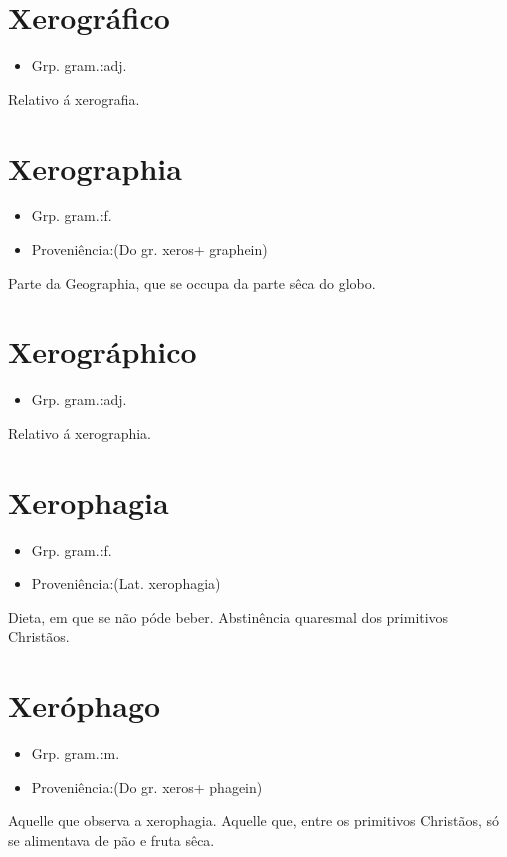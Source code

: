\section{Xerográfico}
\begin{itemize}
\item {Grp. gram.:adj.}
\end{itemize}
Relativo á xerografia.
\section{Xerographia}
\begin{itemize}
\item {Grp. gram.:f.}
\end{itemize}
\begin{itemize}
\item {Proveniência:(Do gr. \textunderscore xeros\textunderscore  + \textunderscore graphein\textunderscore )}
\end{itemize}
Parte da Geographia, que se occupa da parte sêca do globo.
\section{Xerográphico}
\begin{itemize}
\item {Grp. gram.:adj.}
\end{itemize}
Relativo á xerographia.
\section{Xerophagia}
\begin{itemize}
\item {Grp. gram.:f.}
\end{itemize}
\begin{itemize}
\item {Proveniência:(Lat. \textunderscore xerophagia\textunderscore )}
\end{itemize}
Dieta, em que se não póde beber.
Abstinência quaresmal dos primitivos Christãos.
\section{Xeróphago}
\begin{itemize}
\item {Grp. gram.:m.}
\end{itemize}
\begin{itemize}
\item {Proveniência:(Do gr. \textunderscore xeros\textunderscore  + \textunderscore phagein\textunderscore )}
\end{itemize}
Aquelle que observa a xerophagia.
Aquelle que, entre os primitivos Christãos, só se alimentava de pão e fruta sêca.
